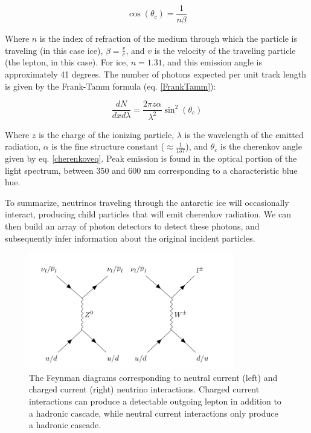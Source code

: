 \begin{equation}
    \cos(\theta_c) = \frac{1}{n\beta}
\label{cherenkoveq}
\end{equation}

Where $n$ is the index of refraction of the medium through which the particle is traveling (in this case ice), $\beta = \frac{v}{c}$, and $v$ is the velocity of the traveling particle (the lepton, in this case).  For ice, $n=1.31$, and this emission angle is approximately 41 degrees. The number of photons expected per unit track length is given by the Frank-Tamm formula \cite{FrankTamm} (eq. \ref{FrankTamm}):

\begin{equation}
    \frac{dN}{dxd\lambda} = \frac{2\pi z \alpha}{\lambda^2}\sin^2(\theta_c)
\label{FrankTamm}
\end{equation}

Where $z$ is the charge of the ionizing particle, $\lambda$ is the wavelength of the emitted radiation, $\alpha$ is the fine structure constant ($\approx \frac{1}{137}$), and $\theta_c$ is the cherenkov angle given by eq. \ref{cherenkoveq}. Peak emission is found in the optical portion of the light spectrum, between 350 and 600 nm corresponding to a characteristic blue hue. 

To summarize, neutrinos traveling through the antarctic ice will occasionally interact, producing child particles that will emit cherenkov radiation. We can then build an array of photon detectors to detect these photons, and subsequently infer information about the original incident particles. 

\begin{figure}[h]
\centering
\includegraphics[width=0.8\textwidth]{figs/nuinteractions.png}
\caption{The Feynman diagrams corresponding to neutral current (left) and charged current (right) neutrino interactions. Charged current interactions can produce a detectable outgoing lepton in addition to a hadronic cascade, while neutral current interactions only produce a hadronic cascade.}
\label{fig:nuinteractions}
\end{figure}

